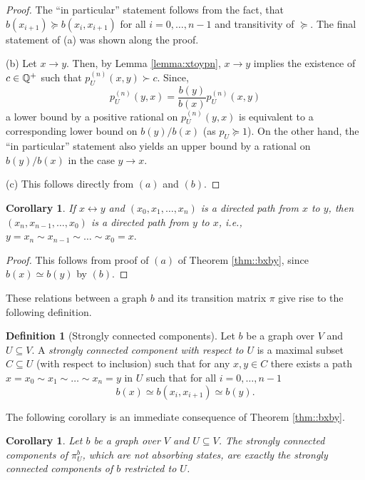 \documentclass[a4paper,oneside, 12pt]{amsart}
\numberwithin{theorem}{section}
\newtheorem{corollary}[theorem]{Corollary}
\theoremstyle{definition}
\newtheorem{definition}[theorem]{Definition}
\newcommand{\subsV}{U}
\begin{document}
{\begin{proof}
The ``in particular'' statement follows from the fact, that $b(x_{i+1})\succeq b(x_{i},x_{i+1})$ for all $ i =0,\ldots,n-1$ and transitivity of $ \succeq $. The final statement of (a) was shown along the proof.\medskip


(b) 
Let $x\to y$. 
Then,  by Lemma  \ref{lemma:xtoypn}, $ x\to y $ implies the existence of $c\in \Bbb Q^+$ such that $p_\subsV^{(n)}(x,y)\succ c$.
Since, 
$$
p_\subsV^{(n)}(y, x)=\dfrac{b(y)}{b(x)}p_\subsV^{(n)}(x,y)
$$
a lower bound by a positive rational on $ p_\subsV^{(n)}(y, x) $ is equivalent to a corresponding lower bound on ${b(y)}/{b(x)} $ (as $ p_{U}\succeq 1 $).  On the other hand, the ``in particular'' statement also yields an upper bound by a  rational on ${b(y)}/{b(x)} $ in the case $ y\to x $.\medskip

(c) This follows directly from $(a)$ and $(b)$.
\end{proof}


{\begin{corollary}\label{cor310}
If $x\leftrightarrow y$ and $(x_0,x_{1},\ldots,x_{n})$ is a directed path from $x$ to $y$, then $(x_n,x_{n-1},\ldots,x_{0})$ is a directed path from $y$ to $x$, i.e.,
$
y=x_n\sim x_{n-1}\sim\dots \sim x_0=x.
$
\end{corollary}
\begin{proof}
This follows from proof of $(a)$ of Theorem \ref{thm::bxby}, since  $b(x)\simeq b(y)$ by $(b)$.
\end{proof}}


These relations between a graph $ b $ and its transition matrix $ \pi $ give rise to the following definition.

\begin{definition}[Strongly connected components]\label{def::StronglyCCGr}
Let $b$ be a  graph over $V$ and $\subsV\subseteq V$.  A \emph{strongly connected component with respect to $U$} is a maximal subset $C\subseteq U$  (with respect to  inclusion) such that for any $x,y\in C$ 
there exists a path $
x=x_0\sim x_1\sim\dots \sim x_n=y
$ in $ U $ such that
 for all $i={0,\ldots, n-1}$ $$ b(x)\simeq b(x_i,x_{i+1})\simeq b(y). $$
\end{definition}
 The following corollary is an immediate consequence of Theorem \ref{thm::bxby}.
\begin{corollary}\label{Corollary:classesb(x)}Let $b$ be a  graph over $V$ and $\subsV\subseteq V$. 
The strongly connected components of $ \pi_{U}^{b}$, which are not absorbing states, are exactly the strongly connected components of $b$ restricted to  $\subsV$.
\end{corollary}


}
\end{document}
